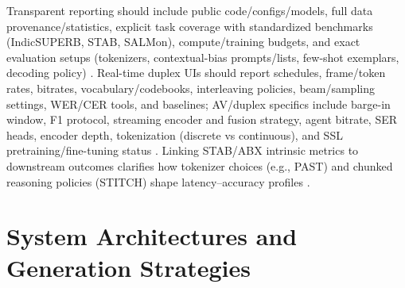 \documentclass{article}
\begin{document}
Transparent reporting should include public code/configs/models, full data provenance/statistics, explicit task coverage with standardized benchmarks (IndicSUPERB, STAB, SALMon), compute/training budgets, and exact evaluation setups (tokenizers, contextual-bias prompts/lists, few-shot exemplars, decoding policy) \cite{vashishth2024stabspeechtokenizerassessmentbenchmark,entry2025indicsuperbspeechprocessinguniversalperf,maimon2025salmonsuiteacousticlanguagemodelevaluati,chen2023reducingbarriersselfsupervisedlearninghu,sun2023contextualbiasingnamedentitieslargelangu}. Real-time duplex UIs should report schedules, frame/token rates, bitrates, vocabulary/codebooks, interleaving policies, beam/sampling settings, WER/CER tools, and baselines; AV/duplex specifics include barge-in window, F1 protocol, streaming encoder and fusion strategy, agent bitrate, SER heads, encoder depth, tokenization (discrete vs continuous), and SSL pretraining/fine-tuning status \cite{yang2024buildingtaiwanesemandarinspokenlanguagem,wang2023slmbridgethingapbetweenspeechtextfoundat,maimon2025salmonsuiteacousticlanguagemodelevaluati,entry2025indicsuperbspeechprocessinguniversalperf,li2025continuousspeechtokenizertext,hu2025salmduplexefficientdirectmodelingspeechl,chen2023reducingbarriersselfsupervisedlearninghu}. Linking STAB/ABX intrinsic metrics to downstream outcomes clarifies how tokenizer choices (e.g., PAST) and chunked reasoning policies (STITCH) shape latency--accuracy profiles \cite{har-tuv2025pastphoneticacousticspeechtokenizer,fily2024establishingdegreesclosenessbetweenaudio,vashishth2024stabspeechtokenizerassessmentbenchmark,entry2025indicsuperbspeechprocessinguniversalperf,chiang2025stitchsimultaneousthinkingtalkingchunked}.

















\section{System Architectures and Generation Strategies} \label{sec:System Architectures and Generation Strategies}
\end{document}
